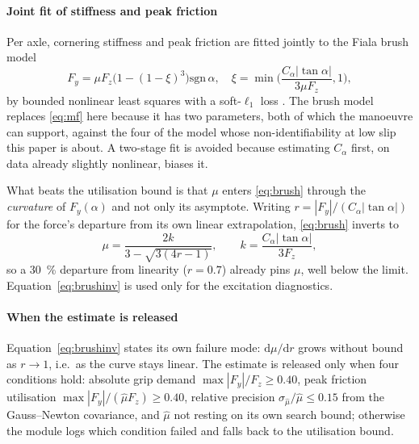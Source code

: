 \paragraph{Joint fit of stiffness and peak friction}
Per axle, cornering stiffness and peak friction are fitted jointly to the Fiala
brush model~\cite{fiala1954,svendenius2004brush,pacejka2012book}
\begin{equation}
F_{y}=\mu F_{z}\big(1-(1-\xi)^{3}\big)\mathrm{sgn}\,\alpha,\quad
\xi=\min\!\Big(\frac{C_{\alpha}|\tan\alpha|}{3\mu F_{z}},1\Big),
\label{eq:brush}
\end{equation}
by bounded nonlinear least squares with a soft-$\ell_{1}$ loss
\cite{virtanen2020scipy,branch1999trust}. The brush model replaces
\eqref{eq:mf} here because it has two parameters, both of which the manoeuvre
can support, against the four of the model whose non-identifiability at low
slip this paper is about. A two-stage fit is avoided because estimating
$C_{\alpha}$ first, on data already slightly nonlinear, biases it.

What beats the utilisation bound is that $\mu$ enters \eqref{eq:brush} through
the \emph{curvature} of $F_{y}(\alpha)$ and not only its asymptote. Writing
$r=|F_{y}|/(C_{\alpha}|\tan\alpha|)$ for the force's departure from its own
linear extrapolation, \eqref{eq:brush} inverts to
\begin{equation}
\mu=\frac{2k}{3-\sqrt{3(4r-1)}},\qquad k=\frac{C_{\alpha}|\tan\alpha|}{3F_{z}},
\label{eq:brushinv}
\end{equation}
so a \SI{30}{\percent} departure from linearity ($r=0.7$) already pins $\mu$,
well below the limit. Equation~\eqref{eq:brushinv} is used only for the
excitation diagnostics.

\paragraph{When the estimate is released}
Equation~\eqref{eq:brushinv} states its own failure mode:
$\mathrm{d}\mu/\mathrm{d}r$ grows without bound as $r\to1$, i.e.\ as the curve
stays linear. The estimate is released only when four conditions hold:
absolute grip demand $\max|F_{y}|/F_{z}\ge\num{0.40}$, peak friction
utilisation $\max|F_{y}|/(\hat\mu F_{z})\ge\num{0.40}$, relative precision
$\sigma_{\hat\mu}/\hat\mu\le\num{0.15}$ from the Gauss--Newton covariance, and
$\hat\mu$ not resting on its own search bound; otherwise the module logs which
condition failed and falls back to the utilisation bound.

